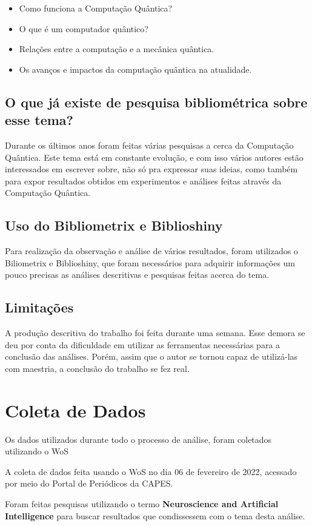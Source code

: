 \begin{itemize}
    \item Como funciona a Computação Quântica?
    \item O que é um computador quântico?
    \item Relações entre a computação e a mecânica quântica.
    \item Os avanços e impactos da computação quântica na atualidade.
\end{itemize}

\subsection{O que já existe de pesquisa bibliométrica sobre esse tema?}

Durante os últimos anos foram feitas várias pesquisas a cerca da Computação Quântica. Este tema está em constante evolução, e com isso vários autores estão interessados em escrever sobre, não só pra expressar suas ideias, como também para expor resultados obtidos em experimentos e análises feitas através da Computação Quântica.

\subsection{Uso do Bibliometrix e Biblioshiny}
Para realização da observação e análise de vários resultados, foram utilizados o Biliometrix e Biblioshiny, que foram necessários para adquirir informações um pouco precisas as análises descritivas e pesquisas feitas acerca do tema.

\subsection{Limitações}
A produção descritiva do trabalho foi feita durante uma semana. Esse demora se deu por conta da dificuldade em utilizar as ferramentas necessárias para a conclusão das análises. Porém, assim que o autor se tornou capaz de utilizá-las com maestria, a conclusão do trabalho se fez real.

\section{Coleta de Dados}

Os dados utilizados durante todo o processo de análise, foram coletados utilizando o WoS



A coleta de dados feita usando o WoS no dia 06 de fevereiro de 2022, acessado por meio do Portal de Periódicos da CAPES.

Foram feitas pesquisas utilizando o termo \textbf{Neuroscience and Artificial Intelligence} para buscar resultados que condissessem com o tema desta análise.



